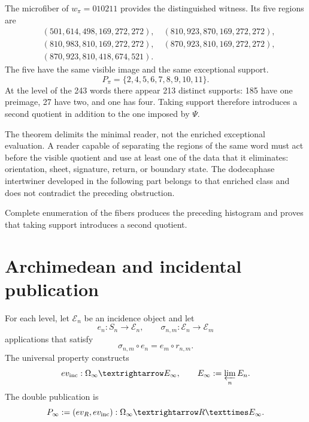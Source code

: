 The microfiber of \(w_\pi=010211\) provides the distinguished witness. Its
five regions are
\[
\begin{split}
 &(501,614,498,169,272,272),\quad
 (810,923,870,169,272,272),\\
 &(810,983,810,169,272,272),\quad
 (870,923,810,169,272,272),\\
 &(870,923,810,418,674,521).
\end{split}
\]
The five have the same visible image and the same exceptional support.
\[
 P_\pi=\{2,4,5,6,7,8,9,10,11\}.
\]
At the level of the 243 words there appear 213 distinct supports: 185 have
one preimage, 27 have two, and one has four. Taking support therefore introduces
a second quotient in addition to the one imposed by \(\Psi\).

The theorem delimits the minimal reader, not the enriched exceptional
evaluation. A reader capable of separating the regions of the same word
must act before the visible quotient and use at least one of the data
that it eliminates: orientation, sheet, signature, return, or boundary state. The
dodecaphase intertwiner developed in the following part belongs to that
enriched class and does not contradict the preceding obstruction.

Complete enumeration of the fibers produces the preceding histogram and
proves that taking support introduces a second quotient.


\section{Archimedean and incidental publication}

For each level, let \(\mathcal E_n\) be an incidence object and let
\begin{equation}
 e_n:S_n\longrightarrow\mathcal E_n,
 \qquad
 \sigma_{n,m}:\mathcal E_n\longrightarrow\mathcal E_m
 \label{p12-83-c17-s5:eq:datos-lector-incidencial-u024}
\end{equation}
applications that satisfy
\begin{equation}
 \sigma_{n,m}\circ e_n=e_m\circ r_{n,m}.
 \label{p12-83-c17-s5:eq:naturalidad-lector-incidencial-u024}
\end{equation}
The universal property constructs
\begin{equation}
 \operatorname{ev}_{\rm inc}:\Omega_\infty
 \longrightarrow\mathcal E_\infty,
 \qquad
 \mathcal E_\infty:=\varprojlim_n\mathcal E_n.
 \label{p12-83-c17-s5:eq:evaluacion-incidencial-limite-u024}
\end{equation}
The double publication is
\begin{equation}
 \mathcal P_\infty
 :=(\operatorname{ev}_{\mathbb R},\operatorname{ev}_{\rm inc}):
 \Omega_\infty\longrightarrow\mathbb R\times\mathcal E_\infty.
 \label{p12-83-c17-s5:eq:doble-publicacion-continuo-u024}
\end{equation}

